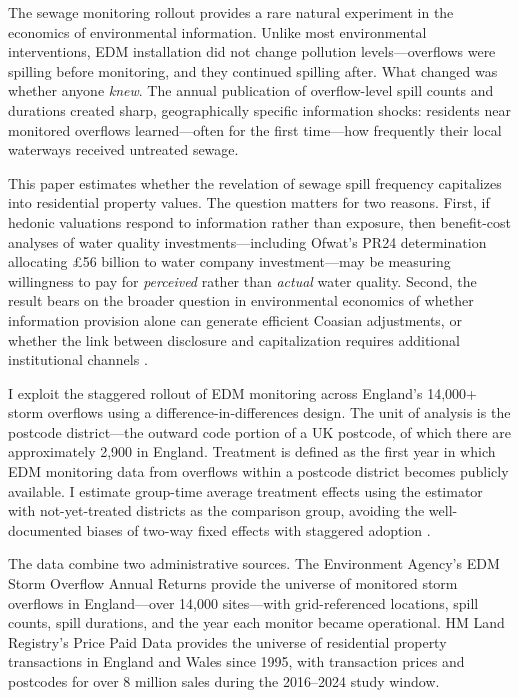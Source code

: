 \documentclass[12pt]{article}
\begin{document}
The sewage monitoring rollout provides a rare natural experiment in the economics of environmental information. Unlike most environmental interventions, EDM installation did not change pollution levels---overflows were spilling before monitoring, and they continued spilling after. What changed was whether anyone \textit{knew}. The annual publication of overflow-level spill counts and durations created sharp, geographically specific information shocks: residents near monitored overflows learned---often for the first time---how frequently their local waterways received untreated sewage.

This paper estimates whether the revelation of sewage spill frequency capitalizes into residential property values. The question matters for two reasons. First, if hedonic valuations respond to information rather than exposure, then benefit-cost analyses of water quality investments---including Ofwat's PR24 determination allocating \pounds56 billion to water company investment---may be measuring willingness to pay for \textit{perceived} rather than \textit{actual} water quality. Second, the result bears on the broader question in environmental economics of whether information provision alone can generate efficient Coasian adjustments, or whether the link between disclosure and capitalization requires additional institutional channels \citep{keiser2019}.

I exploit the staggered rollout of EDM monitoring across England's 14,000+ storm overflows using a difference-in-differences design. The unit of analysis is the postcode district---the outward code portion of a UK postcode, of which there are approximately 2,900 in England. Treatment is defined as the first year in which EDM monitoring data from overflows within a postcode district becomes publicly available. I estimate group-time average treatment effects using the \citet{callaway2021} estimator with not-yet-treated districts as the comparison group, avoiding the well-documented biases of two-way fixed effects with staggered adoption \citep{goodman-bacon2021, sun2021}.

The data combine two administrative sources. The Environment Agency's EDM Storm Overflow Annual Returns provide the universe of monitored storm overflows in England---over 14,000 sites---with grid-referenced locations, spill counts, spill durations, and the year each monitor became operational. HM Land Registry's Price Paid Data provides the universe of residential property transactions in England and Wales since 1995, with transaction prices and postcodes for over 8 million sales during the 2016--2024 study window.
\end{document}
